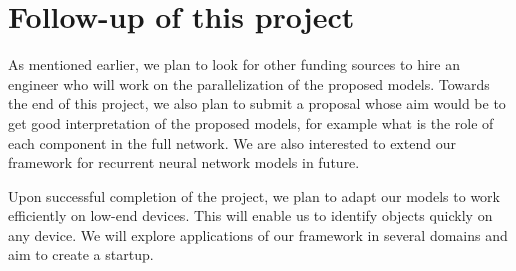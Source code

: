 \documentclass[11pt]{article}
\begin{document}
\section{Follow-up of this project}
As mentioned earlier, we plan to look for other funding sources to hire an engineer who will work on the parallelization of the proposed models. Towards the end of this project, we also plan to submit a proposal whose aim would be to get good interpretation of the proposed models, for example what is the role of each component in the full network. We are also interested to extend our framework for recurrent neural network models in future. 

Upon successful completion of the project, we plan to adapt our models to work efficiently on low-end devices. This will enable us to  identify objects quickly on any device. We will explore applications of our framework in several domains and aim to create a startup.


%
%
\end{document}
